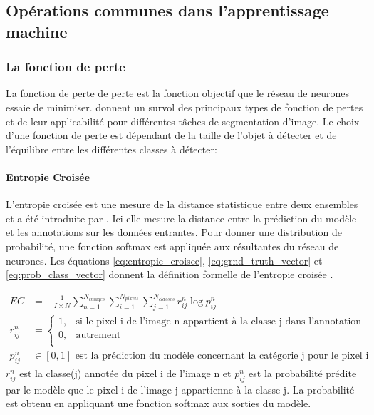   \subsection{Opérations communes dans l'apprentissage machine}
    \subsubsection{La fonction de perte}
      La fonction de perte de perte est la fonction objectif que le réseau de neurones essaie de minimiser. \textcite{azad_loss_2023, jadon_survey_2020} donnent un survol des principaux types de fonction de pertes et de leur applicabilité pour différentes tâches de segmentation d'image. Le choix d'une fonction de perte est dépendant de la taille de l'objet à détecter et de l'équilibre entre les différentes classes à détecter:\par
      \paragraph{Entropie Croisée} L'entropie croisée est une mesure de la distance statistique entre deux ensembles et a été introduite par \textcite{shannon_mathematical_1948}. Ici elle mesure la distance entre la prédiction du modèle et les annotations sur les données entrantes. Pour donner une distribution de probabilité, une fonction softmax est appliquée aux résultantes du réseau de neurones.
      Les équations \ref{eq:entropie_croisee}, \ref{eq:grnd_truth_vector} et \ref{eq:prob_class_vector} donnent la définition formelle de l'entropie croisée \parencite{wallach_deep_2024}.\par
      \begin{align}
        EC & = -\frac{1}{I \times N} \sum_{n=1}^{N_{images}}\sum_{i=1}^{N_{pixels}}\sum_{j=1}^{N_{classes}}r^{n}_{ij} \log{p^{n}_{ij}} \label{eq:entropie_croisee}\\
        r^{n}_{ij} & = \begin{cases}
          1,& \mbox{si le pixel i de l'image n appartient à la classe j dans l'annotation d'entrainement}\\
          0,& \mbox{autrement}\\ \end{cases}\label{eq:grnd_truth_vector}\\
        p^{n}_{ij} & \in [0,1]\mbox{ est la prédiction du modèle concernant la catégorie j pour le pixel i}\label{eq:prob_class_vector}
      \end{align}
      $r^{n}_{ij}$ est la classe(j) annotée du pixel i de l'image n et $p^{n}_{ij}$ est la probabilité prédite par le modèle que le pixel i de l'image j appartienne à la classe j. La probabilité est obtenu en appliquant une fonction softmax aux sorties du modèle. 
